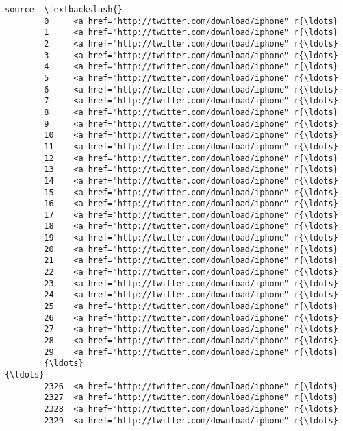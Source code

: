 \documentclass[11pt]{article}
\begin{document}
\begin{Verbatim}[commandchars=\\\{\}]
                                                         source  \textbackslash{}
        0     <a href="http://twitter.com/download/iphone" r{\ldots}   
        1     <a href="http://twitter.com/download/iphone" r{\ldots}   
        2     <a href="http://twitter.com/download/iphone" r{\ldots}   
        3     <a href="http://twitter.com/download/iphone" r{\ldots}   
        4     <a href="http://twitter.com/download/iphone" r{\ldots}   
        5     <a href="http://twitter.com/download/iphone" r{\ldots}   
        6     <a href="http://twitter.com/download/iphone" r{\ldots}   
        7     <a href="http://twitter.com/download/iphone" r{\ldots}   
        8     <a href="http://twitter.com/download/iphone" r{\ldots}   
        9     <a href="http://twitter.com/download/iphone" r{\ldots}   
        10    <a href="http://twitter.com/download/iphone" r{\ldots}   
        11    <a href="http://twitter.com/download/iphone" r{\ldots}   
        12    <a href="http://twitter.com/download/iphone" r{\ldots}   
        13    <a href="http://twitter.com/download/iphone" r{\ldots}   
        14    <a href="http://twitter.com/download/iphone" r{\ldots}   
        15    <a href="http://twitter.com/download/iphone" r{\ldots}   
        16    <a href="http://twitter.com/download/iphone" r{\ldots}   
        17    <a href="http://twitter.com/download/iphone" r{\ldots}   
        18    <a href="http://twitter.com/download/iphone" r{\ldots}   
        19    <a href="http://twitter.com/download/iphone" r{\ldots}   
        20    <a href="http://twitter.com/download/iphone" r{\ldots}   
        21    <a href="http://twitter.com/download/iphone" r{\ldots}   
        22    <a href="http://twitter.com/download/iphone" r{\ldots}   
        23    <a href="http://twitter.com/download/iphone" r{\ldots}   
        24    <a href="http://twitter.com/download/iphone" r{\ldots}   
        25    <a href="http://twitter.com/download/iphone" r{\ldots}   
        26    <a href="http://twitter.com/download/iphone" r{\ldots}   
        27    <a href="http://twitter.com/download/iphone" r{\ldots}   
        28    <a href="http://twitter.com/download/iphone" r{\ldots}   
        29    <a href="http://twitter.com/download/iphone" r{\ldots}   
        {\ldots}                                                 {\ldots}   
        2326  <a href="http://twitter.com/download/iphone" r{\ldots}   
        2327  <a href="http://twitter.com/download/iphone" r{\ldots}   
        2328  <a href="http://twitter.com/download/iphone" r{\ldots}   
        2329  <a href="http://twitter.com/download/iphone" r{\ldots}   

\end{Verbatim}
\end{document}
